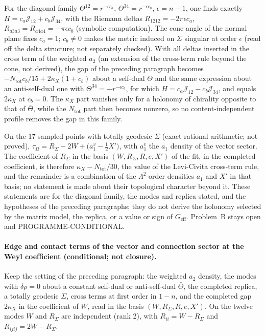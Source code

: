 For the diagonal family \(\Theta^{12}=r^{-\epsilon c_a}\), \(\Theta^{34}=r^{-\epsilon c_b}\), \(\epsilon=n-1\), one finds exactly \(H=c_a\mathcal J_{12}+c_b\mathcal J_{34}\), with the Riemann deltas \(R_{1212}=-2\pi\epsilon c_a\), \(R_{a3a3}=R_{a4a4}=-\pi\epsilon c_b\) (symbolic computation). The cone angle of the normal plane fixes \(c_a=1\); \(c_b\neq0\) makes the metric induced on \(\Sigma\) singular at order \(\epsilon\) (read off the delta structure; not separately checked). With all deltas inserted in the cross term of the weighted \(a_2\) (an extension of the cross-term rule beyond the cone, not derived), the gap of the preceding paragraph becomes \(-N_{\mathrm{tot}}c_b/15+2\kappa_X(1+c_b)\) about a self-dual \(\bar\Theta\) and the same expression about an anti-self-dual one with \(\Theta^{34}=-r^{-\epsilon c_b}\), for which \(H=c_a\mathcal J_{12}-c_b\mathcal J_{34}\), and equals \(2\kappa_X\) at \(c_b=0\). The \(\kappa_X\) part vanishes only for a holonomy of chirality opposite to that of \(\bar\Theta\), while the \(N_{\mathrm{tot}}\) part then becomes nonzero, so no content-independent profile removes the gap in this family.

On the 17 sampled points with totally geodesic \(\Sigma\) (exact rational arithmetic; not proved), \(\tau_\Omega=R_\Sigma-2W+\bigl(a_1^{v}-\tfrac12X'\bigr)\), with \(a_1^{v}\) the \(a_1\) density of the vector sector. The coefficient of \(R_\Sigma\) in the basis \((W,R_\Sigma,R,e,X')\) of the fit, in the completed coefficient, is therefore \(\kappa_X-N_{\mathrm{tot}}/30\), the value of the Levi-Civita cross-term rule, and the remainder is a combination of the \(\Lambda^2\)-order densities \(a_1\) and \(X'\) in that basis; no statement is made about their topological character beyond it. These statements are for the diagonal family, the modes and replica stated, and the hypotheses of the preceding paragraphs; they do not derive the holonomy selected by the matrix model, the replica, or a value or sign of \(G_{\mathrm{eff}}\). Problem~B stays open and PROGRAMME-CONDITIONAL.

\paragraph{Edge and contact terms of the vector and connection sector at the Weyl coefficient (conditional; not closure).}
Keep the setting of the preceding paragraph: the weighted \(a_2\) density, the modes with \(\delta\rho=0\) about a constant self-dual or anti-self-dual \(\bar\Theta\), the completed replica, a totally geodesic \(\Sigma\), cross terms at first order in \(1-n\), and the completed gap \(2\kappa_X\) in the coefficient of \(W\), read in the basis \((W,R_\Sigma,R,e,X')\). On the twelve modes \(W\) and \(R_\Sigma\) are independent (rank 2), with \(R_{ii}=W-R_\Sigma\) and \(R_{ijij}=2W-R_\Sigma\).

